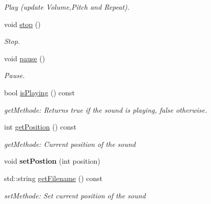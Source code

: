 \begin{DoxyCompactItemize}
\begin{DoxyCompactList}\small\item\em Play (update Volume,Pitch and Repeat). \item\end{DoxyCompactList}\item 
\hypertarget{class_f2_c_1_1_audio_file_a561e9174955aceab50247cd78a4f4b06}{
void \hyperlink{class_f2_c_1_1_audio_file_a561e9174955aceab50247cd78a4f4b06}{stop} ()}
\label{class_f2_c_1_1_audio_file_a561e9174955aceab50247cd78a4f4b06}

\begin{DoxyCompactList}\small\item\em Stop. \item\end{DoxyCompactList}\item 
\hypertarget{class_f2_c_1_1_audio_file_a12916f619b8aec5d7598cb4c0440a586}{
void \hyperlink{class_f2_c_1_1_audio_file_a12916f619b8aec5d7598cb4c0440a586}{pause} ()}
\label{class_f2_c_1_1_audio_file_a12916f619b8aec5d7598cb4c0440a586}

\begin{DoxyCompactList}\small\item\em Pause. \item\end{DoxyCompactList}\item 
\hypertarget{class_f2_c_1_1_audio_file_a68c97a63861927e7099bfa87848ef781}{
bool \hyperlink{class_f2_c_1_1_audio_file_a68c97a63861927e7099bfa87848ef781}{isPlaying} () const }
\label{class_f2_c_1_1_audio_file_a68c97a63861927e7099bfa87848ef781}

\begin{DoxyCompactList}\small\item\em getMethode: Returns true if the sound is playing, false otherwise. \item\end{DoxyCompactList}\item 
\hypertarget{class_f2_c_1_1_audio_file_a0e1914642d211c376f53d207d6d5ec5b}{
int \hyperlink{class_f2_c_1_1_audio_file_a0e1914642d211c376f53d207d6d5ec5b}{getPosition} () const }
\label{class_f2_c_1_1_audio_file_a0e1914642d211c376f53d207d6d5ec5b}

\begin{DoxyCompactList}\small\item\em getMethode: Current position of the sound \item\end{DoxyCompactList}\item 
\hypertarget{class_f2_c_1_1_audio_file_a0883e1dcba9286eba384507752007eed}{
void {\bfseries setPostion} (int position)}
\label{class_f2_c_1_1_audio_file_a0883e1dcba9286eba384507752007eed}

\item 
std::string \hyperlink{class_f2_c_1_1_audio_file_aab2fd2600fd2282972b73b5f5fd60b4b}{getFilename} () const 
\begin{DoxyCompactList}\small\item\em setMethode: Set current position of the sound \item\end{DoxyCompactList}\end{DoxyCompactItemize}
